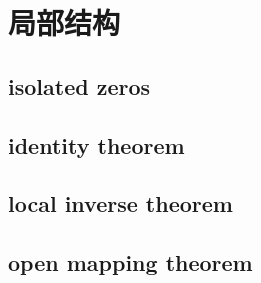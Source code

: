 \section{局部结构}
\label{b3:sec:0104}


\subsection{isolated zeros}
\label{b3:subsec:010401}

\subsection{identity theorem}
\label{b3:subsec:010402}

\subsection{local inverse theorem}
\label{b3:subsec:010403}

\subsection{open mapping theorem}
\label{b3:subsec:010404}


